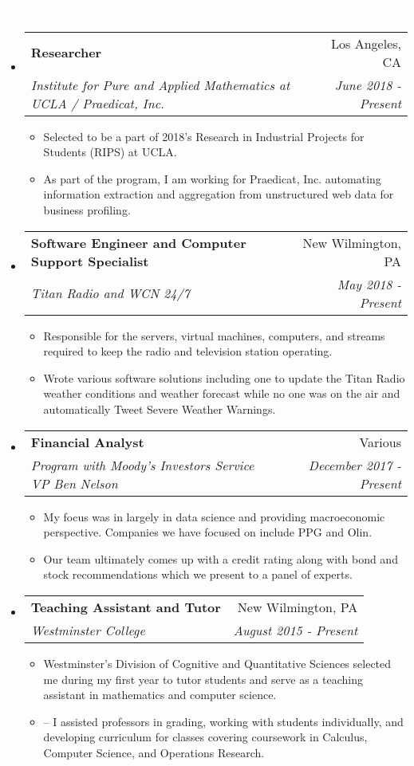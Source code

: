 \documentclass[letterpaper,11pt]{article}
\makeatletter
\newcommand{\resitem}[1]{\item #1 \vspace{-2pt}}
\newcommand{\resheading}[1]{{\large \colorbox{mypurple}{\begin{minipage}{\textwidth}{\textbf{#1 \vphantom{p\^{E}}}}\end{minipage}}}}
\newcommand{\ressubheading}[4]{
	\begin{tabular*}{7.0in}{l@{\extracolsep{\fill}}r}
		\textbf{#1} & #2 \\
		\textit{#3} & \textit{#4} \\
	\end{tabular*}\vspace{-6pt}}
\makeatother
\begin{document}
	\resheading{\textcolor{white}{Professional Experience}}
	\begin{itemize}
		\item
		\ressubheading{Researcher}{Los Angeles, CA}{Institute for Pure and Applied Mathematics at UCLA / Praedicat, Inc.}{June 2018 - Present}
		\begin{itemize}
			\resitem{Selected to be a part of 2018’s Research in Industrial Projects for Students (RIPS) at UCLA.}
			\resitem{As part of the program, I am working for Praedicat, Inc. automating information extraction and aggregation from unstructured web data for business profiling.}
		\end{itemize}
	\item
		\ressubheading{Software Engineer and Computer Support Specialist}{New Wilmington, PA}{Titan Radio and WCN 24/7}{May 2018 - Present}
		\begin{itemize}
			\resitem{Responsible for the servers, virtual machines, computers, and streams required to keep the radio and television station operating.}
			\resitem{Wrote various software solutions including one to update the Titan Radio weather conditions and weather forecast while no one was on the air and automatically Tweet Severe Weather Warnings.}
		\end{itemize}
		\item
		\ressubheading{Financial Analyst}{Various}{Program with Moody’s Investors Service VP Ben Nelson}{December 2017 - Present}
		\begin{itemize}
			\resitem{My focus was in largely in data science and providing macroeconomic perspective. Companies we have focused on include PPG and Olin.}
			\resitem{Our team ultimately comes up with a credit rating along with bond and stock recommendations which we present to a panel of experts.}
		\end{itemize}
	
	\item
		\ressubheading{Teaching Assistant and Tutor}{New Wilmington, PA}{Westminster College}{August 2015 - Present}
		\begin{itemize}
			\resitem{Westminster’s Division of Cognitive and Quantitative Sciences selected me during my first year to tutor students and serve as a teaching assistant in mathematics and computer science.}
			\resitem{– I assisted professors in grading, working with students individually, and developing curriculum for classes covering coursework in Calculus, Computer Science, and Operations Research.}
		\end{itemize}
		

\end{itemize}
\end{document}
